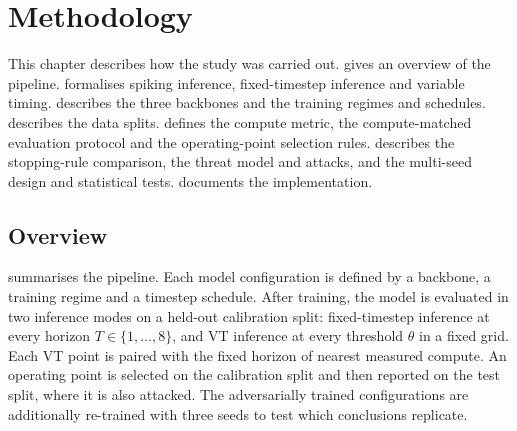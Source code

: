 \chapter{Methodology}
\label{ch:method}

This chapter describes how the study was carried out.  gives an overview of the pipeline.  formalises spiking inference, fixed-timestep inference and variable timing.  describes the three backbones and  the training regimes and schedules.  describes the data splits.  defines the compute metric,  the compute-matched evaluation protocol and  the operating-point selection rules.  describes the stopping-rule comparison,  the threat model and attacks, and  the multi-seed design and statistical tests.  documents the implementation.

\section{Overview}
\label{sec:meth-overview}

 summarises the pipeline. Each model configuration is defined by a backbone, a training regime and a timestep schedule. After training, the model is evaluated in two inference modes on a held-out calibration split: fixed-timestep inference at every horizon $T \in \{1, \dots, 8\}$, and VT inference at every threshold $\theta$ in a fixed grid. Each VT point is paired with the fixed horizon of nearest measured compute. An operating point is selected on the calibration split and then reported on the test split, where it is also attacked. The adversarially trained configurations are additionally re-trained with three seeds to test which conclusions replicate.

